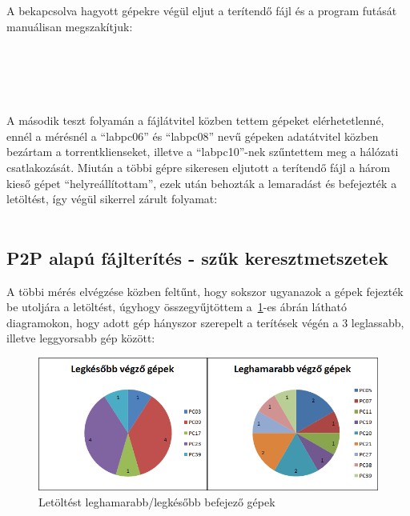 A bekapcsolva hagyott gépekre végül eljut a terítendő fájl és a program futását manuálisan megszakítjuk:\\\\
\\
\\
\\\\
A második teszt folyamán a fájlátvitel közben tettem gépeket elérhetetlenné, ennél a mérésnél a ``labpc06'' és ``labpc08'' nevű gépeken adatátvitel közben bezártam a torrentklienseket, illetve a ``labpc10''-nek szűntettem meg a hálózati csatlakozását. Miután a többi gépre sikeresen eljutott a terítendő fájl a három kieső gépet ``helyreállítottam'', ezek után behozták a lemaradást és befejezték a letöltést, így végül sikerrel zárult folyamat:\\\\

%
\subsection{P2P alapú fájlterítés - szűk keresztmetszetek}
%

A többi mérés elvégzése közben feltűnt, hogy sokszor ugyanazok a gépek fejezték be utoljára a letöltést, úgyhogy összegyűjtöttem a~\ref{fig:computerdownloadspeeds}-es ábrán látható diagramokon, hogy adott gép hányszor szerepelt a terítések végén a 3 leglassabb, illetve leggyorsabb gép között:


\begin{figure}[ht]
\centering
\includegraphics[width=150mm, keepaspectratio]{figures/Perf_computers.png}
\caption{Letöltést leghamarabb/legkésőbb befejező gépek}
\label{fig:computerdownloadspeeds}
\end{figure}

